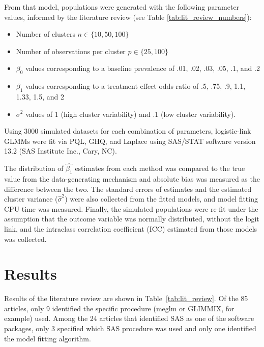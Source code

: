 \documentclass[Afour,times,sagev,doublespace]{sagej}
\begin{document}
From that model, populations were generated with the following parameter values, informed by the literature review (see Table \ref{tab:lit_review_numbers}):
\begin{itemize}
    \item Number of clusters $n \in \{10, 50, 100\}$
    \item Number of observations per cluster $p \in \{25, 100\}$
    \item $\beta_0$ values corresponding to a baseline prevalence of .01, .02, .03, .05, .1, and .2
    \item $\beta_1$ values corresponding to a treatment effect odds ratio of .5, .75, .9, 1.1, 1.33, 1.5, and 2
    \item $\sigma^2$ values of 1 (high cluster variability) and .1 (low cluster variability).
\end{itemize}

Using 3000 simulated datasets for each combination of parameters, logistic-link GLMMs were fit via PQL, GHQ, and Laplace using SAS/STAT software version 13.2 (SAS Institute Inc., Cary, NC).

The distribution of $\hat{\beta_1}$ estimates from each method was compared to the true value from the data-generating mechanism and absolute bias was measured as the difference between the two. The standard errors of estimates and the estimated cluster variance ($\hat{\sigma}^2$) were also collected from the fitted models, and model fitting CPU time was measured. Finally, the simulated populations were re-fit under the assumption that the outcome variable was normally distributed, without the logit link, and the intraclass correlation coefficient (ICC) estimated from those models was collected.





\section{Results}

Results of the literature review are shown in Table~\ref{tab:lit_review}. Of the 85 articles, only 9 identified the specific procedure (meglm or GLIMMIX, for example) used. Among the 24 articles that identified SAS as one of the software packages, only 3 specified which SAS procedure was used and only one identified the model fitting algorithm.
\end{document}
